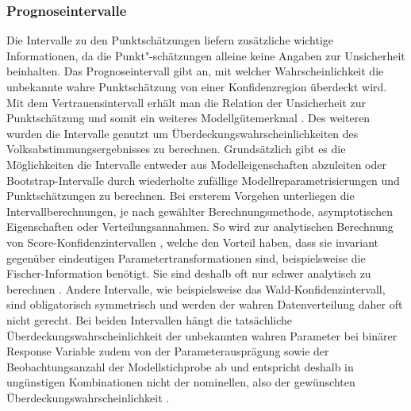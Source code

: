 \documentclass{Vorlage}
\begin{document}
\subsubsection{Prognoseintervalle}
Die Intervalle zu den Punktschätzungen liefern zusätzliche wichtige Informationen, da die Punkt"-schätzungen alleine keine Angaben zur Unsicherheit beinhalten. Das Prognoseintervall gibt an, mit welcher Wahrscheinlichkeit die unbekannte wahre Punktschätzung von einer Konfidenzregion überdeckt wird. Mit dem Vertrauensintervall erhält man die Relation der Unsicherheit zur Punktschätzung und somit ein weiteres Modellgütemerkmal \cite[p. 471]{fahrmeir2013regression}. Des weiteren wurden die Intervalle genutzt um Überdeckungswahrscheinlichkeiten des Volksabstimmungsergebnisses \cite{Amt} zu berechnen. Grundsätzlich gibt es die Möglichkeiten die Intervalle entweder aus Modelleigenschaften abzuleiten oder Bootstrap-Intervalle durch wiederholte zufällige Modellreparametrisierungen und Punktschätzungen zu berechnen. Bei ersterem Vorgehen unterliegen die Intervallberechnungen, je nach gewählter Berechnungsmethode, asymptotischen Eigenschaften oder Verteilungsannahmen. So wird zur analytischen Berechnung von Score-Konfidenzintervallen \cite[p. 64 ff.]{held2008}, welche den Vorteil haben, dass sie invariant gegenüber eindeutigen Parametertransformationen sind, beispielsweise die Fischer-Information benötigt. Sie sind deshalb oft nur schwer analytisch zu berechnen \cite[p. 74]{held2008}. Andere Intervalle, wie beispielsweise das Wald-Konfidenzintervall, sind obligatorisch symmetrisch \cite[p. 60]{held2008} und werden der wahren Datenverteilung daher oft nicht gerecht. Bei beiden Intervallen hängt die tatsächliche Überdeckungswahrscheinlichkeit der unbekannten wahren Parameter bei binärer Response Variable zudem von der Parameterausprägung sowie der Beobachtungsanzahl der Modellstichprobe ab und entspricht deshalb in ungünstigen Kombinationen nicht der nominellen, also der gewünschten Überdeckungswahrscheinlichkeit \cite{Int}. 
\end{document}
